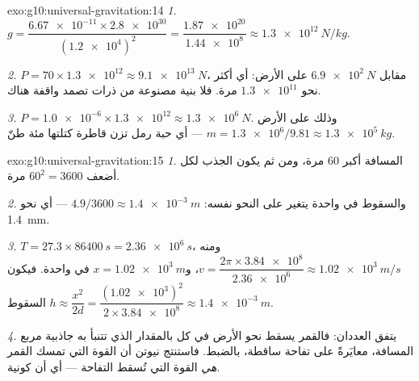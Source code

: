 \begin{solution}{exo:g10:universal-gravitation:14}
\emph{1.} $g = \dfrac{\num{6.67e-11} \times \num{2.8e30}}
{(\num{1.2e4})^2} = \dfrac{\num{1.87e20}}{\num{1.44e8}}
\approx \qty{1.3e12}{N/kg}.$

\emph{2.} $P = 70 \times \num{1.3e12} \approx \qty{9.1e13}{N}$، مقابل
$\qty{6.9e2}{N}$ على الأرض: أي أكثر نحو $\num{1.3e11}$ مرة. فلا
بنية مصنوعة من ذرات تصمد واقفة هناك.

\emph{3.} $P = \num{1.0e-6} \times \num{1.3e12} \approx
\qty{1.3e6}{N}$. وذلك على الأرض 
$m = \num{1.3e6}/9.81 \approx \qty{1.3e5}{kg}$ --- أي حبة رمل
تزن  قاطرة كتلتها مئة طنّ.
\end{solution}

\begin{solution}{exo:g10:universal-gravitation:15}
\emph{1.} المسافة أكبر $60$ مرة، ومن ثم يكون الجذب لكل 
أضعف $60^2 = 3600$ مرة.

\emph{2.} والسقوط في  واحدة يتغير على النحو نفسه:
$4.9/3600 \approx \qty{1.4e-3}{m}$ --- أي نحو \qty{1.4}{mm}.

\emph{3.} $T = 27.3 \times \qty{86400}{s} = \qty{2.36e6}{s}$، ومنه
$v = \dfrac{2\pi \times \num{3.84e8}}{\num{2.36e6}} \approx
\qty{1.02e3}{m/s}$، و$x = \qty{1.02e3}{m}$ في  واحدة. فيكون السقوط
$h \approx \dfrac{x^2}{2d}
= \dfrac{(\num{1.02e3})^2}{2 \times \num{3.84e8}}
\approx \qty{1.4e-3}{m}$.

\emph{4.} يتفق العددان: فالقمر يسقط نحو الأرض في كل
 بالمقدار الذي تتنبأ به جاذبية مربع المسافة، معايَرةً على
تفاحة ساقطة، بالضبط. فاستنتج نيوتن أن القوة التي تمسك
القمر \emph{هي} القوة التي تُسقط التفاحة --- أي أن 
كونية.
\end{solution}

